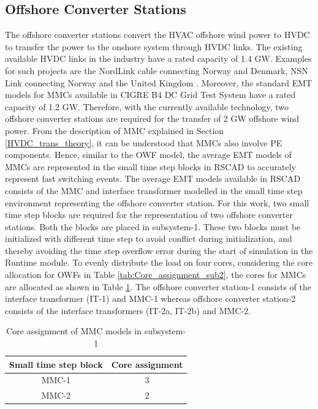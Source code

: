 \subsection{Offshore Converter Stations}
The offshore converter stations convert the \gls{HVAC} offshore wind power to \gls{HVDC} to transfer the power to the onshore system through \gls{HVDC} links.  %
The existing available \gls{HVDC} links in the industry have a rated capacity of 1.4 GW. Examples for such projects are the NordLink cable connecting Norway and Denmark, NSN Link connecting Norway and the United Kingdom \cite{ryndzionek_evolution_2020}. Moreover, the standard \gls{EMT} models for \gls{MMC}s available in CIGRE B4 DC Grid Test System \cite{vrana2013cigre} have a rated capacity of 1.2 GW. Therefore, with the currently available technology, two offshore converter stations are required for the transfer of 2 GW offshore wind power. From the description of \gls{MMC} explained in Section \ref{HVDC_trans_theory}, it can be understood that \gls{MMC}s also involve \gls{PE} components. Hence, similar to the \gls{OWF} model, the average \gls{EMT} models of \gls{MMC}s are represented in the small time step blocks in RSCAD to accurately represent fast switching events. The average \gls{EMT} models available in RSCAD consists of the \gls{MMC} and interface transformer modelled in the small time step environment representing the offshore converter station. For this work, two small time step blocks are required for the representation of two offshore converter stations. Both the blocks are placed in subsystem-1. These two blocks must be initialized with different time step to avoid conflict during initialization, and thereby avoiding the time step overflow error during the start of simulation in the Runtime module. To evenly distribute the load on four cores, considering the core allocation for \gls{OWF}s in Table \ref{tab:Core_assignment_sub2}, the cores for \gls{MMC}s are allocated as shown in Table \ref{tab:Core_assignment_sub1}. The offshore converter station-1 consists of the interface transformer (IT-1) and \gls{MMC}-1 whereas offshore converter station-2 consists of the interface transformers (IT-2a, IT-2b) and \gls{MMC}-2. 

\begin{table}[H]
\centering
\begin{tabular}{|c|c|}
\hline
\textbf{Small time step block} & \textbf{Core assignment} \\ \hline
MMC-1                          & 3                        \\ \hline
MMC-2                          & 2                        \\ \hline

\end{tabular}
\caption{Core assignment of MMC models in subsystem-1}
\label{tab:Core_assignment_sub1}
\end{table}


